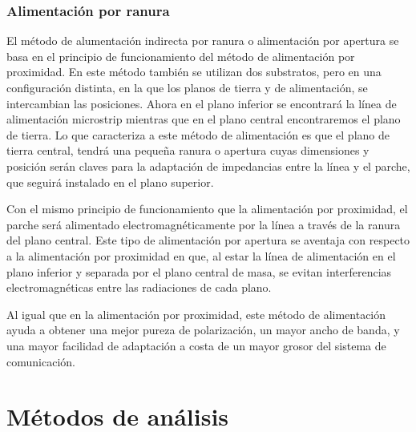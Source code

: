 \subsubsection{Alimentación por ranura}
\par El método de alumentación indirecta por ranura o alimentación por apertura se basa en el principio de funcionamiento del método de alimentación por proximidad. En este método también se utilizan dos substratos, pero en una configuración distinta, en la que los planos de tierra y de alimentación, se intercambian las posiciones. Ahora en el plano inferior se encontrará la línea de alimentación microstrip mientras que en el plano central encontraremos el plano de tierra. Lo que caracteriza a este método de alimentación es que el plano de tierra central, tendrá una pequeña ranura o apertura cuyas dimensiones y posición serán claves para la adaptación de impedancias entre la línea y el parche, que seguirá instalado en el plano superior.
\\
\par Con el mismo principio de funcionamiento que la alimentación por proximidad, el parche será alimentado electromagnéticamente por la línea a través de la ranura del plano central. Este tipo de alimentación por apertura se aventaja con respecto a la alimentación por proximidad en que, al estar la línea de alimentación en el plano inferior y separada por el plano central de masa, se evitan interferencias electromagnéticas entre las radiaciones de cada plano.
\\
\par Al igual que en la alimentación por proximidad, este método de alimentación ayuda a obtener una mejor pureza de polarización, un mayor ancho de banda, y una mayor facilidad de adaptación a costa de un mayor grosor del sistema de comunicación.

\section{Métodos de análisis}

\par 








